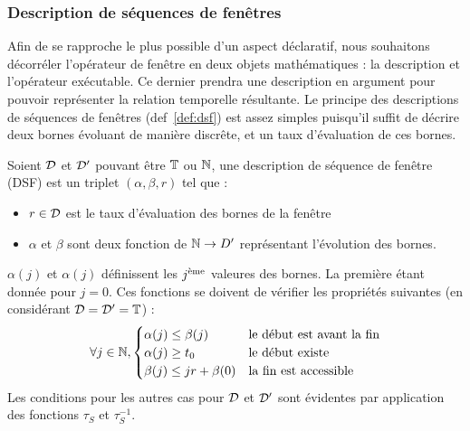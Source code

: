 %
\subsubsection{Description de séquences de fenêtres}
Afin de se rapproche le plus possible d'un aspect déclaratif, nous souhaitons décorréler l'opérateur de fenêtre en deux objets mathématiques : la description et l'opérateur exécutable. Ce dernier prendra une description en argument pour pouvoir représenter la relation temporelle résultante. Le principe des descriptions de séquences de fenêtres (def~\ref{def:dsf}) est assez simples puisqu'il suffit de décrire deux bornes évoluant de manière discrête, et un taux d'évaluation de ces bornes.

\begin{defi}\label{def:dsf}
    Soient $\mathcal{D}$ et $\mathcal{D}'$ pouvant être $\mathbb{T}$ ou $\mathbb{N}$, une description de séquence de fenêtre (DSF) est un triplet $(\alpha,\beta,r)$ tel que :
\begin{itemize}
    \item $r \in \mathcal{D}$ est le taux d'évaluation des bornes de la fenêtre
    \item $\alpha$ et $\beta$ sont deux fonction de $\mathbb{N}\to D'$ représentant l'évolution des bornes.
\end{itemize}

$\alpha(j)$ et $\alpha(j)$ définissent les $j^{\textrm{\`{e}me}}$ valeures des bornes. La première étant donnée pour $j=0$. Ces fonctions se doivent de vérifier les propriétés suivantes (en considérant $\mathcal{D}=\mathcal{D}'=\mathbb{T}$) :
$$\forall j \in \mathbb{N}, \begin{cases} \alpha(j) \leq \beta(j) & \textrm{le début est avant la fin}\\ \alpha(j) \geq t_0 & \textrm{le début existe} \\ \beta(j) \leq jr + \beta(0) & \textrm{la fin est accessible} \end{cases}$$
    Les conditions pour les autres cas pour $\mathcal{D}$ et $\mathcal{D}'$ sont évidentes par application des fonctions $\tau_S$ et $\tau_S^{-1}$.
\end{defi}

